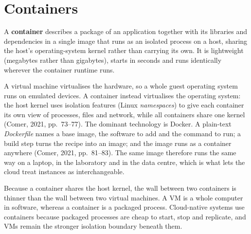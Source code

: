\section{Containers}

\begin{definition}[Container]\label{def:container}
A \textbf{container} describes a package of an application together with its
libraries and dependencies in a single image that runs as an isolated process
on a host, sharing the host's operating-system kernel rather than carrying its
own. It is lightweight (megabytes rather than gigabytes), starts in seconds
and runs identically wherever the container runtime runs.
\end{definition}

A virtual machine virtualises the hardware, so a whole guest operating
system runs on emulated devices. A container instead virtualises the
operating system: the host kernel uses isolation features (Linux
\emph{namespaces}) to give each container its own view of processes, files
and network, while all containers share one kernel (Comer, 2021,
pp.~73--77). The dominant technology is Docker. A plain-text
\emph{Dockerfile} names a base image, the software to add and the command to
run; a build step turns the recipe into an image; and the image runs as a
container anywhere (Comer, 2021, pp.~81--83). The same image therefore runs
the same way on a laptop, in the laboratory and in the data centre, which
is what lets the cloud treat instances as interchangeable.

Because a container shares the host kernel, the wall between two containers
is thinner than the wall between two virtual machines. A VM is a whole
computer in software, whereas a container is a packaged process.
Cloud-native systems use containers because packaged processes are cheap to
start, stop and replicate, and VMs remain the stronger isolation boundary
beneath them.

